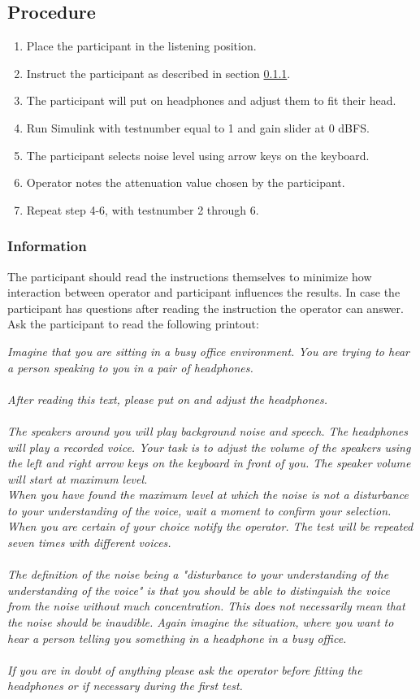 \subsection{Procedure}
\begin{enumerate}
	\item Place the participant in the listening position.
	\item Instruct the participant as described in section \ref{subsubsec:attenuationInformation}.
	\item The participant will put on headphones and adjust them to fit their head.
	\item Run Simulink  with testnumber equal to 1 and gain slider at 0 dBFS.
	\item The participant selects noise level using arrow keys on the keyboard.
	\item Operator notes the attenuation value chosen by the participant.
	\item Repeat step 4-6, with testnumber 2 through 6.
\end{enumerate}

\subsubsection{Information}\label{subsubsec:attenuationInformation}
The participant should read the instructions themselves to minimize how interaction between operator and participant influences the results. In case the participant has questions after reading the instruction the operator can answer.   
Ask the participant to read the following printout:

\textit{Imagine that you are sitting in a busy office environment. You are trying to hear a person speaking to you in a pair of headphones. \\\\
After reading this text, please put on and adjust the headphones.\\\\
The speakers around you will play background noise and speech. The headphones will play a recorded voice. Your task is to adjust the volume of the speakers using the left and right arrow keys on the keyboard in front of you. The speaker volume will start at maximum level. \\
When you have found the maximum level at which the noise is not a disturbance to your understanding of the voice, wait a moment to confirm your selection. When you are certain of your choice notify the operator. 
The test will be repeated seven times with different voices. \\\\
The definition of the noise being a "disturbance to your understanding of the understanding of the voice" is that you should be able to distinguish the voice from the noise without much concentration. This does not necessarily mean that the noise should be inaudible. Again imagine the situation, where you want to hear a person telling you something in a headphone in a busy office.\\\\ 
If you are in doubt of anything please ask the operator before fitting the headphones or if necessary during the first test.}

